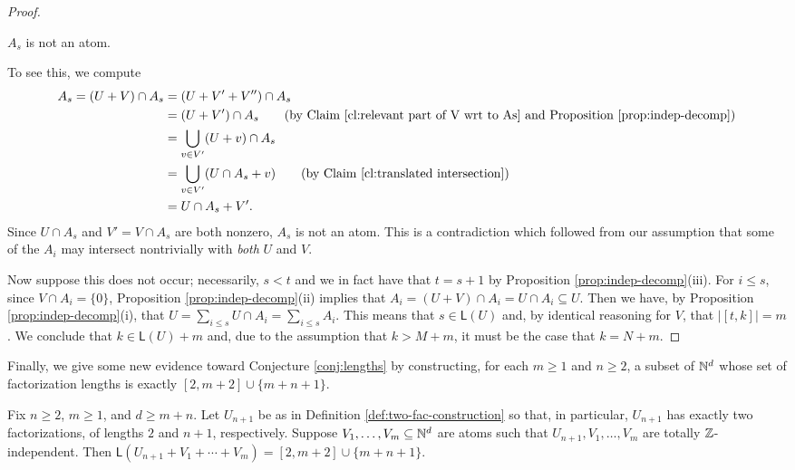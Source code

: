 \begin{proof}
	\begin{claim} \label{cl:orth-decomp of As}
	$A_s$ is not an atom. \label{clf}
	\end{claim}
	
	To see this, we compute
	\begin{align*}
	A_s = (U+V)\cap A_s 
	&= (U+V'+V'') \cap A_s \\
	&= (U+V') \cap A_s \tag{by Claim \ref{cl:relevant part of V wrt to As} and Proposition \ref{prop:indep-decomp}} \\
	&= \bigcup_{v\in V'} (U+v)\cap A_s \\
	&= \bigcup_{v\in V'} (U\cap A_s + v) \tag{by Claim \ref{cl:translated intersection}} \\
	&= U\cap A_s + V'.
	\end{align*}
	Since $U\cap A_s$ and $V' = V\cap A_s$ are both nonzero, $A_s$ is not an atom.
	This is a contradiction which followed from our assumption that some of the $A_i$ may intersect nontrivially with \textit{both} $U$ and $V$.
	
	Now suppose this does not occur; necessarily, $s < t$ and we in fact have that $t = s+1$ by Proposition \ref{prop:indep-decomp}(iii).
	For $i \le s$, since $V\cap A_i  = \{0\}$, Proposition \ref{prop:indep-decomp}(ii) implies that $A_i = (U+V)\cap A_i = U\cap A_i \subseteq U$.
	Then we have, by Proposition \ref{prop:indep-decomp}(i), that $U = \sum_{i\le s} U\cap A_i = \sum_{i\le s} A_i$.
	This means that $s\in \mathsf{L}(U)$ and, by identical reasoning for $V$, that $| [ t,k ]| = m$.
	We conclude that $k \in \mathsf{L}(U) + m$ and, due to the assumption that $k>M+m$, it must be the case that $k = N + m$.
\end{proof}

Finally, we give some new evidence toward Conjecture \ref{conj:lengths} by constructing, for each $m\ge 1$ and $n\ge 2$, a subset of $\mathbb{N}^d$ whose set of factorization lengths is exactly $[2,m+2]\cup\{m+n+1\}$.

\begin{thm} \label{thm:int-point-construction}
	Fix $n\ge 2$, $m\ge 1$, and $d\ge m+n$.
	Let $U_{n+1}$ be as in Definition \ref{def:two-fac-construction} so that, in particular, $U_{n+1}$ has exactly two factorizations, of lengths $2$ and $n+1$, respectively.  
	Suppose $V_1,\dots, V_m \subseteq \mathbb{N}^d$ are atoms such that $U_{n+1},V_1,\dots, V_m$ are totally $\mathbb{Z}$-independent.
	Then $\mathsf{L}(U_{n+1}+V_1+\cdots+V_m) = [ 2,m+2 ] \cup \{m+n+1\}$.
\end{thm}

